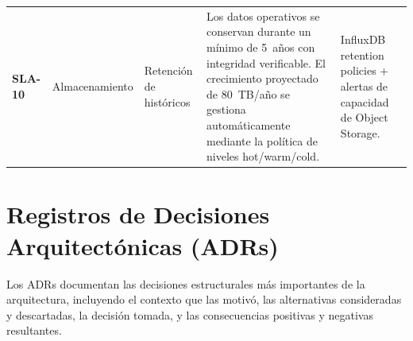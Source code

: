 \documentclass[12pt, letterpaper]{article}
\begin{document}
\begin{longtable}{
  C{1.2cm}
  P{2.2cm}
  P{2.2cm}
  P{4.8cm}
  P{3.3cm}
}
\textbf{SLA-10} & Almacenamiento & Retención de históricos &
  Los datos operativos se conservan durante un mínimo de 5~años con integridad
  verificable. El crecimiento proyectado de 80~TB/año se gestiona automáticamente
  mediante la política de niveles hot/warm/cold. &
  InfluxDB retention policies + alertas de capacidad de Object Storage. \\

\end{longtable}

\section{Registros de Decisiones Arquitectónicas (ADRs)}

Los ADRs documentan las decisiones estructurales más importantes de la arquitectura,
incluyendo el contexto que las motivó, las alternativas consideradas y descartadas,
la decisión tomada, y las consecuencias positivas y negativas resultantes.

\newcommand{\adr}[8]{%
  \begin{longtable}{P{3.2cm} P{10.5cm}}
  \rowcolor{azulPUJ}
  \multicolumn{2}{l}{\textbf{\color{white}#1}} \\
  \endfirsthead
  \rowcolor{azulPUJ}
  \multicolumn{2}{l}{\textbf{\color{white}#1}} \\
  \endhead
  \rowcolor{azulClr}  \textbf{Estado}                    & #2 \\
                      \textbf{Contexto}                   & #3 \\
  \rowcolor{azulClr}  \textbf{Alternativas consideradas}  & #4 \\
  \rowcolor{naranCl}  \textbf{Decisión}                   & #5 \\
  \rowcolor{verdeCl}  \textbf{Consecuencias (+)}          & #6 \\
  \rowcolor{red!8}    \textbf{Consecuencias (--)}         & #7 \\
  \rowcolor{azulClr}  \textbf{Cómo validar}               & #8 \\
  \end{longtable}
  \vspace{4pt}
}
\end{document}
